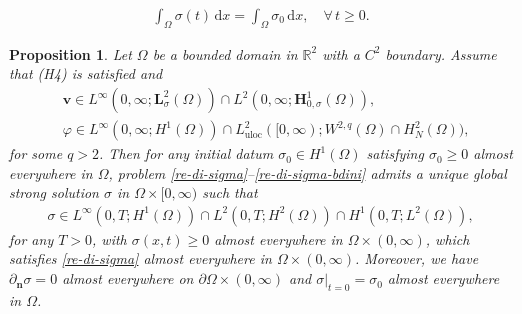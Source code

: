 \documentclass[10pt,a4paper]{amsart}
\newtheorem{proposition}{Proposition}
\def\H{\bm{H}}
\def\L{\bm{L}}
\def\vv{\bm{v}}
\begin{document}
\begin{align}
\int_\Omega\sigma(t)\,\mathrm{d}x=\int_\Omega \sigma_0\,\mathrm{d}x,\quad \forall\, t\geq 0.
\label{conv-sig}
\end{align}

\begin{proposition}
\label{sigma-strong}
Let $\Omega$ be a bounded domain in $\mathbb{R}^2$ with a $C^2$ boundary. Assume that (H4) is satisfied and
%
\begin{align*}
&\vv \in L^{\infty}(0,\infty;\L^2_{\sigma}(\Omega))\cap L^2(0,\infty;\H^1_{0,\sigma}(\Omega)),
\\
&\varphi \in L^\infty(0,\infty;H^1(\Omega))\cap L^2_{\mathrm{uloc}}([0,\infty);W^{2,q}(\Omega)\cap H^2_N(\Omega)),
\end{align*}
%
for some $q>2$. Then for any initial datum $\sigma_0 \in H^1(\Omega)$ satisfying $\sigma_0 \geq 0$ almost everywhere in $\Omega$, problem
\eqref{re-di-sigma}--\eqref{re-di-sigma-bdini} admits a unique global strong solution $\sigma$ in $\Omega\times [0,\infty)$ such that
%
\begin{equation}
\label{REG1}
\begin{split}
\sigma \in L^{\infty}(0,T;H^1(\Omega)) \cap L^2(0,T; H^2(\Omega))\cap H^1(0,T;L^2(\Omega)),
\end{split}
\end{equation}
%
for any $T>0$, with $\sigma(x,t)\geq 0$ almost everywhere in $\Omega \times (0,\infty)$,
which satisfies \eqref{re-di-sigma} almost everywhere in $\Omega\times(0,\infty)$. Moreover, we have $\partial_{\boldsymbol{n}} \sigma =0$ almost everywhere on $\partial\Omega\times(0,\infty)$ and  $\sigma|_{t=0}=\sigma_{0}$ almost everywhere in $\Omega$.
\end{proposition}
\end{document}
